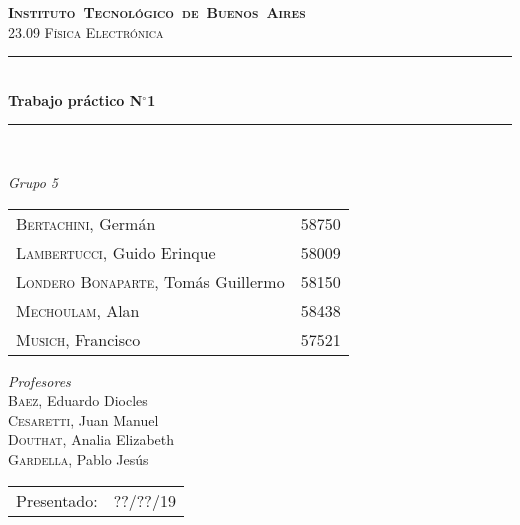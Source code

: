 \begin{titlepage}
\newcommand{\HRule}{\rule{\linewidth}{0.5mm}}
\center
\mbox{\textsc{\LARGE \bfseries {Instituto Tecnológico de Buenos Aires}}}\\[1.5cm]
\textsc{\Large 23.09 Física Electrónica}\\[0.5cm]

\HRule \\[0.6cm]
{ \Huge \bfseries Trabajo práctico N$^{\circ}$1}\\[0.4cm] 
\HRule \\[1.5cm]


{\large

\emph{Grupo 5}\\
\vspace{3px}

\begin{tabular}{lr}
\textsc{Bertachini}, Germán  & 58750 \\ 	
\textsc{Lambertucci}, Guido Erinque  & 58009 \\
\textsc{Londero Bonaparte}, Tomás Guillermo  & 58150 \\
\textsc{Mechoulam}, Alan  &  58438\\
\textsc{Musich}, Francisco  & 57521 \\

\end{tabular}

\vspace{20px}

\emph{Profesores}\\
\vspace{3px}
\textsc{Baez}, Eduardo Diocles\\ 	
\textsc{Cesaretti}, Juan Manuel\\ 
\textsc{Douthat}, Analia Elizabeth\\ 
\textsc{Gardella}, Pablo Jesús\\ 	

\vspace{100px}

\begin{tabular}{ll}

Presentado: & ??/??/19\\

\end{tabular}

}

\vfill

\end{titlepage}
